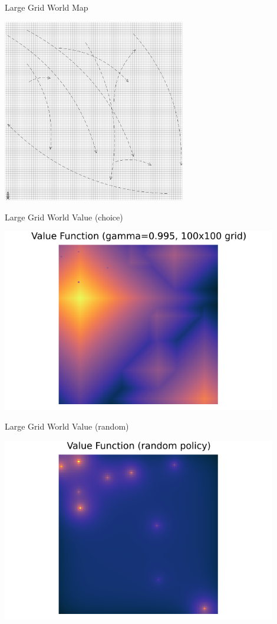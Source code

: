\documentclass{beamer}
\begin{document}
\begin{frame}{Large Grid World Map}
\begin{center}
	\includegraphics[width=8cm]{grid_world_cycle_large.png}
\end{center}
\end{frame}

\begin{frame}{Large Grid World Value (choice)}
\begin{center}
	\includegraphics[width=12cm]{grid_world_value_large.png}
	\end{center}
\end{frame}
\begin{frame}{Large Grid World Value (random)}
\begin{center}
	\includegraphics[width=12cm]{grid_world_value_large_random.png}
\end{center}
\end{frame}
\end{document}
